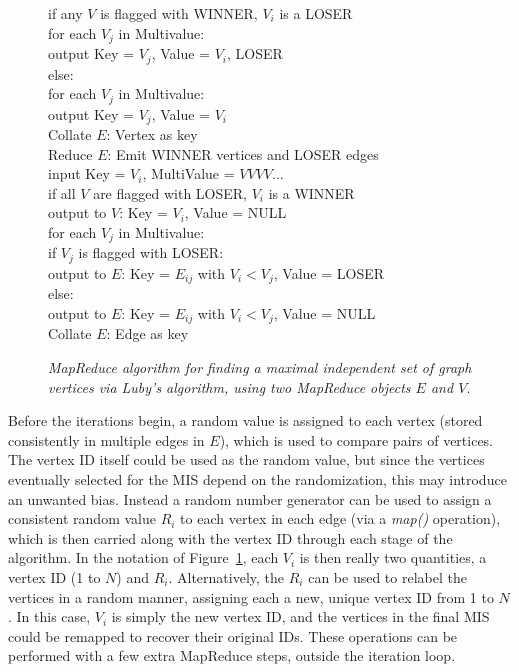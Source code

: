 \begin{figure}[htb]
\begin{center}
{\begin{minipage}{\textwidth}
\begin{tabbing}
       \> \> \> if any $V$ is flagged with WINNER, $V_i$ is a LOSER \\
      \> \> \> \> for each $V_j$ in Multivalue: \\
     \> \> \> \> \> output Key = $V_j$, Value = $V_i$, LOSER \\
       \> \> \> else: \\
      \> \> \> \> for each $V_j$ in Multivalue: \\
     \> \> \> \> \> output Key = $V_j$, Value = $V_i$ \\
 Collate $E$: \> Vertex as key \\
 Reduce $E$: \> Emit WINNER vertices and LOSER edges \\
       \> \> \> input Key = $V_i$, MultiValue = $V V V V ...$ \\
       \> \> \> if all $V$ are flagged with LOSER, $V_i$ is a WINNER \\
      \> \> \> \> output to $V$: Key = $V_i$, Value = NULL \\
       \> \> \> for each $V_j$ in Multivalue: \\
      \> \> \> \> if $V_j$ is flagged with LOSER: \\
     \> \> \> \> \> output to $E$: Key = $E_{ij}$ with $V_i < V_j$, Value = LOSER \\
      \> \> \> \> else: \\
     \> \> \> \> \> output to $E$: Key = $E_{ij}$ with $V_i < V_j$, Value = NULL \\
 Collate $E$: \> Edge as key \\

  \end{tabbing}
 \end{minipage}}\end{center}

 \caption{\it MapReduce algorithm for finding a maximal independent
 set of graph vertices via Luby's algorithm, using two MapReduce
 objects $E$ and $V$.}

 \label{fig:luby}
\end{figure}

Before the iterations begin, a random value is assigned to each vertex
(stored consistently in multiple edges in $E$), which is used to
compare pairs of vertices.  The vertex ID itself could be used as the
random value, but since the vertices eventually selected for the MIS
depend on the randomization, this may introduce an unwanted bias.
Instead a random number generator can be used to assign a consistent
random value $R_i$ to each vertex in each edge (via a {\it map()}
operation), which is then carried along with the vertex ID through
each stage of the algorithm.  In the notation of
Figure~\ref{fig:luby}, each $V_i$ is then really two quantities, a
vertex ID (1 to $N$) and $R_i$.  Alternatively, the $R_i$ can be used
to relabel the vertices in a random manner, assigning each a new,
unique vertex ID from 1 to $N$.  In this case, $V_i$ is simply the new
vertex ID, and the vertices in the final MIS could be remapped to
recover their original IDs.  These operations can be performed with a
few extra MapReduce steps, outside the iteration loop.

